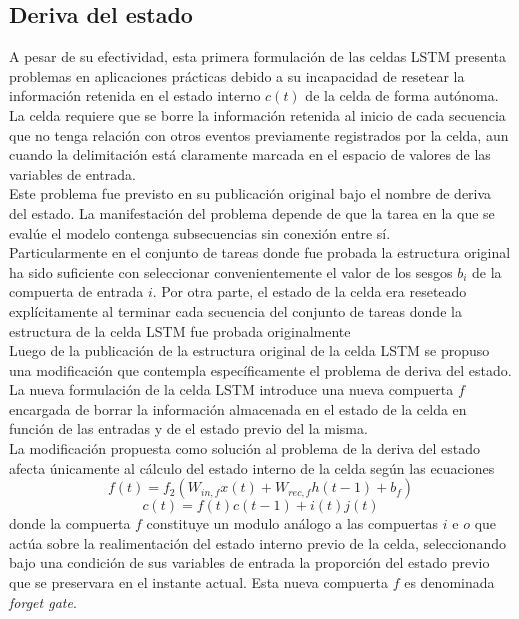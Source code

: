 \documentclass{article}
\begin{document}
	\subsection{Deriva del estado}
	A pesar de su efectividad, esta primera formulación de las celdas LSTM presenta problemas en aplicaciones prácticas debido a su incapacidad de resetear la información retenida en el estado interno $c(t)$ de la celda de forma autónoma. \\
	La celda requiere que se borre la información retenida al inicio de cada secuencia que no tenga relación con otros eventos previamente registrados por la celda, aun cuando la delimitación está claramente marcada en el espacio de valores de las variables de entrada.\\
	Este problema fue previsto en su publicación original bajo el nombre de deriva del estado. La manifestación del problema depende de que la tarea en la que se evalúe el modelo contenga subsecuencias sin conexión entre sí. \\
	Particularmente en el conjunto de tareas donde fue probada la estructura original ha sido suficiente con seleccionar convenientemente el valor de los sesgos $b_i$ de la compuerta de entrada $i$. Por otra parte, el estado de la celda era reseteado explícitamente al terminar cada secuencia del conjunto de tareas donde la estructura de la celda LSTM fue probada originalmente\\
	Luego de la publicación de la estructura original de la celda LSTM se propuso una modificación que contempla específicamente el problema de deriva del estado\cite{16ForgateGatePeepholeConnectionsGers}. La nueva formulación de la celda LSTM introduce una nueva compuerta $f$ encargada de borrar la información almacenada en el estado de la celda en función de las entradas y de el estado previo del la misma.\\
	
	La modificación propuesta como solución al problema de la deriva del estado afecta únicamente al cálculo del estado interno de la celda según las ecuaciones
	\begin{equation*}
	f(t) = f_2(W_{in, f} x(t) + W_{rec, f} h(t-1) + b_f)
	\end{equation*}
	\begin{equation*}
	c(t) = f(t)c(t-1) + i(t)j(t)
	\end{equation*}
	donde la compuerta $f$ constituye un modulo análogo a las compuertas $i$ e $o$ que actúa sobre la realimentación del estado interno previo de la celda, seleccionando bajo una condición de sus variables de entrada la proporción del estado previo que se preservara en el instante actual. Esta nueva compuerta $f$ es denominada \textit{forget gate}.\\
	
\end{document}
